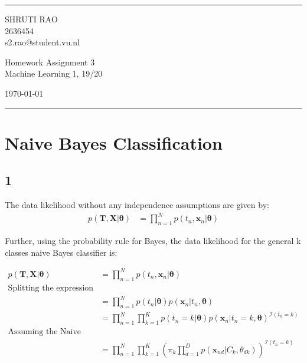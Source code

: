 \documentclass[a4paper]{article}
\begin{document}

\fancyhead[C]{}
\hrule \medskip %
\begin{minipage}{0.295\textwidth} 
\raggedright
\footnotesize
SHRUTI RAO \hfill\\   
2636454 \hfill\\
s2.rao@student.vu.nl
\end{minipage}
\begin{minipage}{0.4\textwidth} 
\centering 
\large 
Homework Assignment 3\\ 
\normalsize 
Machine Learning 1, 19/20\\ 
\end{minipage}
\begin{minipage}{0.295\textwidth} 
\raggedleft
\today\hfill\\
\end{minipage}
\medskip\hrule 
\bigskip


\section*{Naive Bayes Classification}
\subsection*{1}


The data likelihood without any independence assumptions are given by:
\begin{align*}
    p(\pmb{T}, \pmb{X} | \pmb{\theta}) &= \prod_{n=1}^{N} p(t_n, \pmb{x}_n|\pmb{\theta})
\end{align*}{}


Further, using the probability rule for Bayes, the data likelihood for the general k
classes naive Bayes classifier is:

\begin{align*}
    p(\pmb{T}, \pmb{X} | \pmb{\theta}) &= \prod_{n=1}^{N} p(t_n, \pmb{x}_n|\pmb{\theta}) \\
    \text{Splitting the expression using the product rule:} \\
    &= \prod_{n=1}^{N} p(t_n | \pmb{\theta})p(\pmb{x}_n|t_n, \pmb{\theta}) \\ 
    &= \prod_{n=1}^{N} \prod_{k=1}^{K} p(t_n = k| \pmb{\theta})p(\pmb{x}_n|t_n = k, \pmb{\theta}) ^{\mathcal{I}(t_n=k)}\\
    \text{Assuming the Naive Bayes assumption of product over D:}\\
    &= \prod_{n=1}^{N} \prod_{k=1}^{K}\left ( \pi_k \prod_{d=1}^{D} p(\pmb{x}_{nd}|C_k, \theta_{dk}) \right) ^{\mathcal{I}(t_n=k)}\\
\end{align*}{}
\end{document}
